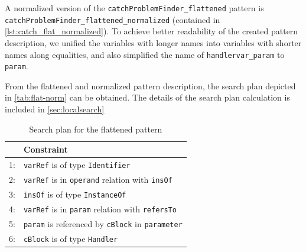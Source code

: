 A normalized version of the \mbox{\texttt{catchProblemFinder\_flattened}} pattern is \mbox{\texttt{catchProblemFinder\_flattened\_normalized}} (contained in \autoref{lst:catch_flat_normalized}). To achieve better readability of the created pattern description, we unified the variables with longer names into variables with shorter names along equalities, and also simplified the name of \texttt{handlervar\_param} to \texttt{param}.  

\begin{figure}[!htbp]
\end{figure}

From the flattened and normalized pattern description, the search plan depicted in \autoref{tab:flat-norm} can be obtained. The details of the search plan calculation is included in \autoref{sec:localsearch}

\begin{table}[h]
	\centering
	\begin{tabular}{c|l}
		\hline
		& Constraint \\ \hline
		1: & \texttt{varRef} is of type \texttt{Identifier} \\
		2: & \texttt{varRef} is in \texttt{operand} relation with \texttt{insOf} \\
		3: & \texttt{insOf} is of type \texttt{InstanceOf} \\
		4: & \texttt{varRef} is in \texttt{param} relation with \texttt{refersTo} \\
		5: & \texttt{param} is referenced by \texttt{cBlock} in \texttt{parameter} \\
		6: & \texttt{cBlock} is of type \texttt{Handler} \\
		
	\end{tabular}
	\caption{Search plan for the flattened pattern}
	\label{tab:flat-norm}
\end{table}

